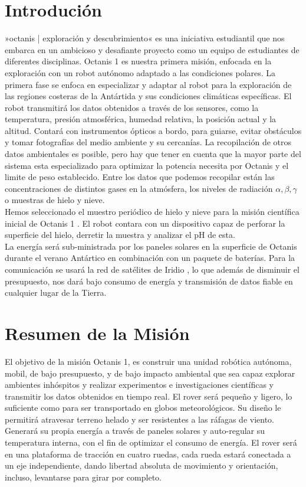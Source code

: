 \documentclass[a4paper,12pt]{article}
\begin{document}
\tableofcontents

\pagebreak

\section{Introdución}
»octanis | exploración y descubrimiento« \cite{octanis}  es una iniciativa estudiantil que nos embarca en un ambicioso y desafiante proyecto como un equipo de estudiantes de diferentes disciplinas. Octanis 1 es nuestra primera misión, enfocada en la exploración con un robot autónomo adaptado a las condiciones polares. La primera fase se enfoca en especializar y adaptar al robot para la exploración de las regiones costeras de la Antártida y sus condiciones climáticas específicas. El robot transmitirá los datos obtenidos a través de los sensores, como la temperatura, presión atmosférica, humedad relativa, la posición actual y la altitud. Contará con instrumentos ópticos a bordo, para guiarse, evitar obstáculos y tomar fotografías del medio ambiente y su cercanías. La recopilación de otros datos ambientales es posible, pero hay que tener en cuenta que la mayor parte del sistema esta especializado para optimizar la potencia necesita por Octanis y el limite de peso establecido. Entre los datos que podemos recopilar están las concentraciones de distintos gases en la atmósfera, los niveles de radiación $\alpha, \beta, \gamma$ o muestras de hielo y nieve. \\ Hemos seleccionado el muestro periódico de hielo y nieve para la misión científica inicial de Octanis 1 \cite{krishnakant}. El robot contara con un dispositivo capaz de perforar la superficie del hielo, derretir la muestra y analizar el pH de esta.
\\ La energía será sub-ministrada por los paneles solares en la superficie de Octanis durante el verano Antártico en combinación con un paquete de baterías. Para la comunicación se usará la red de satélites de Iridio \cite{iridium}, lo que además de disminuir el presupuesto, nos dará bajo consumo de energía y transmisión de datos fiable en cualquier lugar de la Tierra. 



\section{Resumen de la Misión}

El objetivo de la misión Octanis 1, es construir una unidad robótica autónoma, mobil, de bajo presupuesto, y de bajo impacto ambiental que sea capaz explorar ambientes inhóspitos y realizar experimentos e investigaciones científicas y transmitir los datos obtenidos en tiempo real. El rover será pequeño y ligero, lo suficiente como para ser transportado en globos meteorológicos. Su diseño le permitirá atravesar terreno helado y ser resistentes a las ráfagas de viento. Generará su propia energía a través de paneles solares y auto-regular su temperatura interna, con el fin de optimizar el consumo de energía. El rover será en una plataforma de tracción en cuatro ruedas, cada rueda estará conectada a un eje independiente, dando libertad absoluta de movimiento y orientación, incluso, levantarse para girar por completo.
\end{document}
